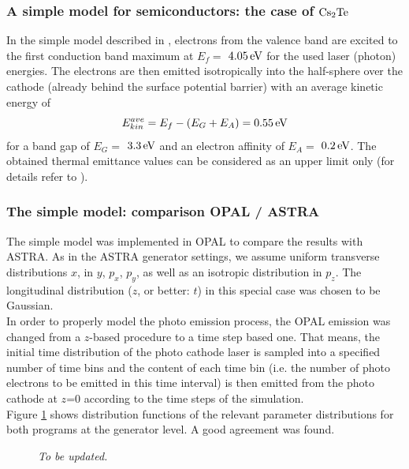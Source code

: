 \documentclass{psi-note}    %
\newcommand{\unit}[2]{$#1\, \rm{#2}$}
\begin{document}
\subsubsection{A simple model for semiconductors: the case of $\rm{Cs_2Te}$}
In the simple model described in \cite{KLAUS}, electrons from the valence band
are excited to the first conduction band maximum at $E_f =$ \unit{4.05}{eV} for
the used laser (photon) energies. The electrons are then emitted isotropically
into the half-sphere over the cathode (already behind the surface potential
barrier) with an average kinetic energy of $$E_{kin}^{ave} = E_f - (E_G + E_A) =
0.55 \, \rm{eV}$$ for a band gap of $E_G =$ \unit{3.3}{eV} and an electron
affinity of $E_A =$ \unit{0.2}{eV}. The obtained thermal emittance values can be
considered as an upper limit only (for details refer to \cite{KLAUS}).

\subsubsection{The simple model: comparison OPAL / ASTRA}
The simple model was implemented in OPAL to compare the results with ASTRA. As
in the ASTRA generator settings, we assume uniform transverse distributions $x$,
in $y$, $p_x$, $p_y$, as well as an isotropic distribution in $p_z$. The
longitudinal distribution ($z$, or better: $t$) in this special case was chosen
to be Gaussian. \\
In order to properly model the photo emission process, the OPAL emission was
changed from a $z$-based procedure to a time step based one. That means, the
initial time distribution of the photo cathode laser is sampled into a specified
number of time bins and the content of each time bin (i.e. the number of photo
electrons to be emitted in this time interval) is then emitted from the photo
cathode at $z$=0 according to the time steps of the simulation.\\
Figure \ref{PLOT1} shows distribution functions of the relevant parameter
distributions for both programs at the generator level. A good agreement was
found.

\begin{figure}[ht!]
    \begin{center}
    \end{center}
    \caption{\small \sl To be updated.} 
    \label{PLOT1}
\end{figure}
\end{document}
